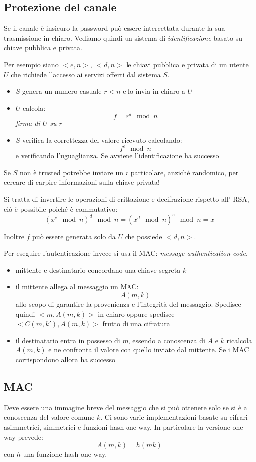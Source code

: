 \subsection{Protezione del canale}
Se il canale è insicuro la password può essere intercettata durante la sua trasmissione in chiaro.
Vediamo quindi un sistema di \emph{identificazione} basato su chiave pubblica e privata.

Per esempio siano $<e,n>$, $<d,n>$ le chiavi pubblica e privata di un utente $U$ che richiede l'accesso ai servizi offerti dal sistema $S$.
\begin{itemize}
    \item $S$ genera un numero casuale $r < n$ e lo invia in chiaro a $U$
    \item $U$ calcola:
    $$ f = r^d \mod n $$
    \emph{firma di $U$ su $r$}
    \item $S$ verifica la correttezza del valore ricevuto calcolando:
    $$ f^e \mod n $$
    e verificando l'uguaglianza. Se avviene l'identificazione ha successo
\end{itemize}

Se $S$ non è trusted potrebbe inviare un $r$ particolare, anziché randomico, per cercare di carpire informazioni sulla chiave privata!

Si tratta di invertire le operazioni di crittazione e decifrazione rispetto all' RSA, ciò è possibile poiché è commutativo:
$$ (x^e \mod n)^d \mod n = (x^d \mod n)^e \mod n = x $$

Inoltre $f$ può essere generata solo da $U$ che possiede $<d, n>$.

Per eseguire l'autenticazione invece si usa il MAC: \emph{message authentication code}.
\begin{itemize}
    \item mittente e destinatario concordano una chiave segreta $k$
    \item il mittente allega al messaggio un MAC:
    $$ A(m,k) $$
    allo scopo di garantire la provenienza e l'integrità del messaggio.
    Spedisce quindi $<m, A(m,k)>$ in chiaro oppure spedisce $<C(m,k'),A(m,k)>$ frutto di una cifratura
    \item il destinatario entra in possesso di $m$, essendo a conoscenza di $A$ e $k$ ricalcola $A(m,k)$ e ne confronta il valore con quello inviato dal mittente. Se i MAC corrispondono allora ha successo
\end{itemize}

\subsection{MAC}
Deve essere una immagine breve del messaggio che si può ottenere solo se si è a conoscenza del valore comune $k$.
Ci sono varie implementazioni basate su cifrari asimmetrici, simmetrici e funzioni hash one-way.
In particolare la versione one-way prevede:
$$ A(m,k) = h(mk) $$
con $h$ una funzione hash one-way.

